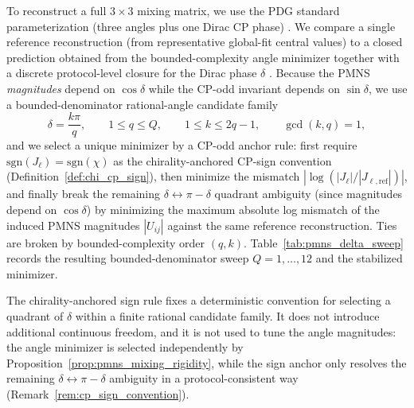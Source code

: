 To reconstruct a full $3\times 3$ mixing matrix, we use the PDG standard parameterization (three angles plus one Dirac CP phase) \cite{PDGRPP2024}.
We compare a single reference reconstruction (from representative global-fit central values) to a closed prediction obtained from the bounded-complexity angle minimizer together with a discrete protocol-level closure for the Dirac phase $\delta$ \cite{Esteban2020NuFIT}.
Because the PMNS \emph{magnitudes} depend on $\cos\delta$ while the CP-odd invariant depends on $\sin\delta$, we use a bounded-denominator rational-angle candidate family
\[
\delta=\frac{k\pi}{q},\qquad 1\le q\le Q,
\qquad 1\le k\le 2q-1,\qquad \gcd(k,q)=1,
\]
and we select a unique minimizer by a CP-odd anchor rule:
first require $\mathrm{sgn}(J_\ell)=\mathrm{sgn}(\chi)$ as the chirality-anchored CP-sign convention (Definition~\ref{def:chi_cp_sign}), then minimize the mismatch $|\log(|J_\ell|/|J_{\ell,\mathrm{ref}}|)|$, and finally break the remaining $\delta\leftrightarrow \pi-\delta$ quadrant ambiguity (since magnitudes depend on $\cos\delta$) by minimizing the maximum absolute log mismatch of the induced PMNS magnitudes $|U_{ij}|$ against the same reference reconstruction.
Ties are broken by bounded-complexity order $(q,k)$.
Table~\ref{tab:pmns_delta_sweep} records the resulting bounded-denominator sweep $Q=1,\dots,12$ and the stabilized minimizer.
\begin{remark}\label{rem:pmns_cp_sign_status}
The chirality-anchored sign rule fixes a deterministic convention for selecting a quadrant of $\delta$ within a finite rational candidate family.
It does not introduce additional continuous freedom, and it is not used to tune the angle magnitudes: the angle minimizer is selected independently by Proposition~\ref{prop:pmns_mixing_rigidity}, while the sign anchor only resolves the remaining $\delta\leftrightarrow \pi-\delta$ ambiguity in a protocol-consistent way (Remark~\ref{rem:cp_sign_convention}).
\end{remark}

\begin{table}[t]
\centering
\small
\setlength{\tabcolsep}{10pt}
\renewcommand{\arraystretch}{1.15}
%
\caption{Bounded-denominator closure for the PMNS Dirac phase $\delta$ using a chirality-anchored CP-sign convention (Definition~\ref{def:chi_cp_sign}) and a deterministic bounded-complexity tie-break. Here $E_{\infty}(|U|):=\max_{i,j}|\log(|U_{ij}|_{\mathrm{closed}}/|U_{ij}|_{\mathrm{ref}})||$ is the max abs.\ log mismatch of the induced PMNS magnitudes against the reference reconstruction. Rows are reproduced by the deterministic script \texttt{scripts/exp\_pmns\_matrix\_closure.py}.}
\label{tab:pmns_delta_sweep}
\end{table}


